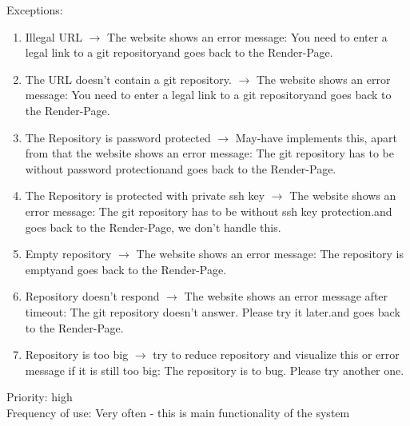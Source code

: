\documentclass[11pt]{scrartcl}
\begin{document}
Exceptions:
\begin{enumerate}
\item Illegal URL $\rightarrow$ The website shows an error message: \glqq You need to enter a legal link to a git repository\grqq and goes back to the \glqq Render\grqq-Page.
\item The URL doesn't contain a git repository. $\rightarrow$  The website shows an error message: \glqq You need to enter a legal link to a git repository\grqq and goes back to the \glqq Render\grqq-Page.
\item The Repository is password protected $\rightarrow$ May-have implements this, apart from that the website shows an error message: \glqq The git repository has to be without password protection\grqq and goes back to the \glqq Render\grqq-Page.
\item The Repository is protected with private ssh key $\rightarrow$ The website shows an error message: \glqq The git repository has to be without ssh key protection.\grqq and goes back to the \glqq Render\grqq-Page, we don't handle this.
\item Empty repository $\rightarrow$ The website shows an error message: \glqq The repository is empty\grqq and goes back to the \glqq Render\grqq-Page.
\item Repository doesn't respond $\rightarrow$ The website shows an error message after timeout: \glqq The git repository doesn't answer. Please try it later.\grqq and goes back to the \glqq Render\grqq-Page. 
\item Repository is too big $\rightarrow$  try to reduce repository and visualize this or error message if it is still too big: \glqq The repository is to bug. Please try another one.\grqq
\end{enumerate}

Priority: high \\
Frequency of use: Very often - this is main functionality of the system\\
\end{document}
